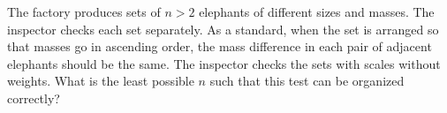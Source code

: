 \problem
The factory produces sets of $n > 2$ elephants of different sizes and masses.
The inspector checks each set separately.
As a standard, when the set is arranged so that masses go in ascending order,
the mass difference in each pair of adjacent elephants should be the same.
The inspector checks the sets with scales without weights.
What is the least possible $n$ such that this test can be organized
correctly?
\solution
\endproblem
